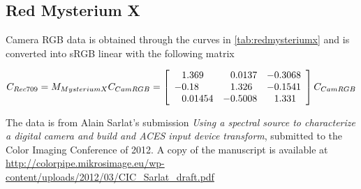 \subsection{Red Mysterium X}

Camera \gls{RGB} data is obtained through the curves in
\cref{tab:redmysteriumx} and is converted into
\gls{sRGB} linear with the following matrix

\begin{displaymath}
C_{Rec709} = M_{MysteriumX} C_{CamRGB} = \left[\begin{array}{r@{.}lr@{.}lr@{.}l}
 1&369   &  0&0137 & -0&3068 \\
-0&18    &  1&326  & -0&1541 \\
 0&01454 & -0&5008 &  1&331  \\
\end{array}\right] C_{CamRGB}
\end{displaymath}

The data is from Alain Sarlat's submission \textit{Using a spectral source to characterize a digital camera
and build and ACES input device transform}, submitted to the Color Imaging Conference of 2012.
A copy of the manuscript is available at \url{http://colorpipe.mikrosimage.eu/wp-content/uploads/2012/03/CIC_Sarlat_draft.pdf}

